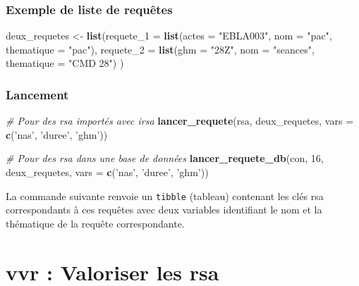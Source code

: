 \documentclass[]{book}
\newenvironment{Shaded}{\begin{snugshade}}{\end{snugshade}}
\newcommand{\CommentTok}[1]{\textcolor[rgb]{0.56,0.35,0.01}{\textit{#1}}}
\newcommand{\DataTypeTok}[1]{\textcolor[rgb]{0.13,0.29,0.53}{#1}}
\newcommand{\DecValTok}[1]{\textcolor[rgb]{0.00,0.00,0.81}{#1}}
\newcommand{\KeywordTok}[1]{\textcolor[rgb]{0.13,0.29,0.53}{\textbf{#1}}}
\newcommand{\NormalTok}[1]{#1}
\newcommand{\StringTok}[1]{\textcolor[rgb]{0.31,0.60,0.02}{#1}}
\begin{document}
\hypertarget{exemple-de-liste-de-requetes}{%
\subsection{Exemple de liste de requêtes}\label{exemple-de-liste-de-requetes}}

\begin{Shaded}
\begin{Highlighting}[]
\NormalTok{deux_requetes <-}\StringTok{ }\KeywordTok{list}\NormalTok{(}\DataTypeTok{requete_1 =} \KeywordTok{list}\NormalTok{(}\DataTypeTok{actes =} \StringTok{"EBLA003"}\NormalTok{, }\DataTypeTok{nom =} \StringTok{"pac"}\NormalTok{, }\DataTypeTok{thematique =} \StringTok{"pac"}\NormalTok{),}
                      \DataTypeTok{requete_2 =} \KeywordTok{list}\NormalTok{(}\DataTypeTok{ghm =} \StringTok{"28Z"}\NormalTok{, }\DataTypeTok{nom =} \StringTok{"seances"}\NormalTok{, }\DataTypeTok{thematique =} \StringTok{"CMD 28"}\NormalTok{)}
\NormalTok{)}
\end{Highlighting}
\end{Shaded}

\hypertarget{lancement}{%
\subsection{Lancement}\label{lancement}}

\begin{Shaded}
\begin{Highlighting}[]
\CommentTok{# Pour des rsa importés avec irsa}
\KeywordTok{lancer_requete}\NormalTok{(rsa, deux_requetes, }\DataTypeTok{vars =} \KeywordTok{c}\NormalTok{(}\StringTok{'nas'}\NormalTok{, }\StringTok{'duree'}\NormalTok{, }\StringTok{'ghm'}\NormalTok{))}

\CommentTok{# Pour des rsa dans une base de données}
\KeywordTok{lancer_requete_db}\NormalTok{(con, }\DecValTok{16}\NormalTok{, deux_requetes, }\DataTypeTok{vars =} \KeywordTok{c}\NormalTok{(}\StringTok{'nas'}\NormalTok{, }\StringTok{'duree'}\NormalTok{, }\StringTok{'ghm'}\NormalTok{))}
\end{Highlighting}
\end{Shaded}

La commande suivante renvoie un \texttt{tibble} (tableau) contenant les clés rsa correspondants à ces requêtes avec deux variables identifiant le nom et la thématique de la requête correspondante.

\hypertarget{vvr-valoriser-les-rsa}{%
\chapter{vvr : Valoriser les rsa}\label{vvr-valoriser-les-rsa}}
\end{document}
